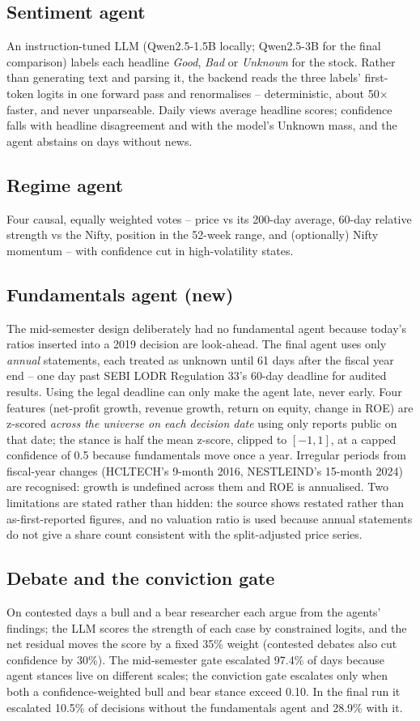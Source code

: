 \documentclass[11pt,a4paper]{article}
\begin{document}
\subsection{Sentiment agent}
An instruction-tuned LLM (Qwen2.5-1.5B locally; Qwen2.5-3B for the final comparison) labels each headline \emph{Good}, \emph{Bad} or \emph{Unknown} for the stock. Rather than generating text and parsing it, the backend reads the three labels' first-token logits in one forward pass and renormalises -- deterministic, about 50$\times$ faster, and never unparseable. Daily views average headline scores; confidence falls with headline disagreement and with the model's Unknown mass, and the agent abstains on days without news.
\subsection{Regime agent}
Four causal, equally weighted votes -- price vs its 200-day average, 60-day relative strength vs the Nifty, position in the 52-week range, and (optionally) Nifty momentum -- with confidence cut in high-volatility states.
\subsection{Fundamentals agent (new)}
The mid-semester design deliberately had no fundamental agent because today's ratios inserted into a 2019 decision are look-ahead. The final agent uses only \emph{annual} statements, each treated as unknown until 61 days after the fiscal year end -- one day past SEBI LODR Regulation 33's 60-day deadline for audited results. Using the legal deadline can only make the agent late, never early. Four features (net-profit growth, revenue growth, return on equity, change in ROE) are z-scored \emph{across the universe on each decision date} using only reports public on that date; the stance is half the mean z-score, clipped to $[-1,1]$, at a capped confidence of 0.5 because fundamentals move once a year. Irregular periods from fiscal-year changes (HCLTECH's 9-month 2016, NESTLEIND's 15-month 2024) are recognised: growth is undefined across them and ROE is annualised. Two limitations are stated rather than hidden: the source shows restated rather than as-first-reported figures, and no valuation ratio is used because annual statements do not give a share count consistent with the split-adjusted price series.
\subsection{Debate and the conviction gate}
On contested days a bull and a bear researcher each argue from the agents' findings; the LLM scores the strength of each case by constrained logits, and the net residual moves the score by a fixed 35\% weight (contested debates also cut confidence by 30\%). The mid-semester gate escalated 97.4\% of days because agent stances live on different scales; the conviction gate escalates only when both a confidence-weighted bull and bear stance exceed 0.10. In the final run it escalated 10.5\% of decisions without the fundamentals agent and 28.9\% with it.
\end{document}
